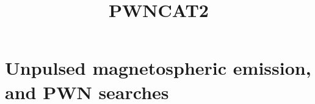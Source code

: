 \documentclass[12pt,preprint]{aastex}
\begin{document}
\title{PWNCAT2}


\listoftodos



\section{Unpulsed magnetospheric emission, and PWN searches}












\end{document}
